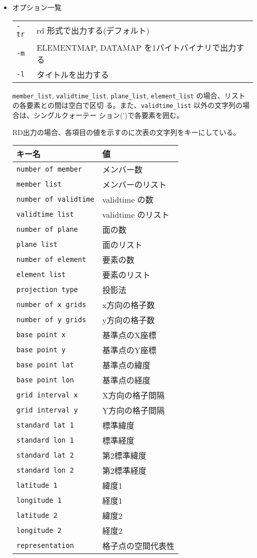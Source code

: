 \begin{itemize}
\item オプション一覧\\
\begin{tabular}{ll}
{\tt -tr} & rd 形式で出力する(デフォルト) \\
{\tt -m} & ELEMENTMAP, DATAMAP を1バイトバイナリで出力する\\
{\tt -l} & タイトルを出力する \\
\end{tabular}

{\tt member\_list}, {\tt validtime\_list}, 
{\tt plane\_list}, {\tt element\_list} の場合、リスト
の各要素との間は空白で区切
る。また、{\tt validtime\_list} 以外の文字列の場合は、シングルクォーテー
ション(')で各要素を囲む。

RD出力の場合、各項目の値を示すのに次表の文字列をキーにしている。

\begin{tabular}{l|l}\hline
キー名          & 値  \\\hline
{\tt number of member} & メンバー数 \\
{\tt member list} & メンバーのリスト \\
{\tt number of validtime} & validtime の数 \\
{\tt validtime list} & validtime のリスト \\
{\tt number of plane} & 面の数 \\
{\tt plane list} & 面のリスト \\
{\tt number of element} & 要素の数 \\
{\tt element list} & 要素のリスト \\
{\tt projection type} & 投影法 \\
{\tt number of x grids} & x方向の格子数 \\
{\tt number of y grids} & y方向の格子数 \\
{\tt base point x} & 基準点のX座標 \\
{\tt base point y} & 基準点のY座標 \\
{\tt base point lat} & 基準点の緯度 \\
{\tt base point lon} & 基準点の経度 \\
{\tt grid interval x} & X方向の格子間隔 \\
{\tt grid interval y} & Y方向の格子間隔 \\
{\tt standard lat 1} & 標準緯度 \\
{\tt standard lon 1} & 標準経度 \\
{\tt standard lat 2} & 第2標準緯度 \\
{\tt standard lon 2} & 第2標準経度 \\
{\tt latitude 1} & 緯度1 \\
{\tt longitude 1} & 経度1 \\
{\tt latitude 2} & 緯度2 \\
{\tt longitude 2} & 経度2 \\
{\tt representation} & 格子点の空間代表性\\\hline
\end{tabular}
\end{itemize}


